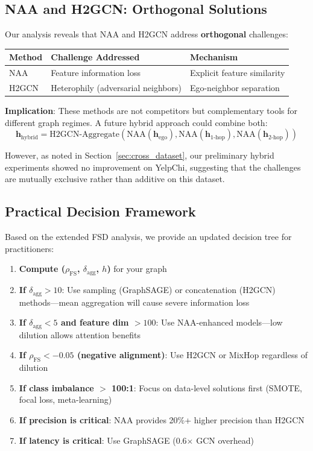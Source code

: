 \subsection{NAA and H2GCN: Orthogonal Solutions}

Our analysis reveals that NAA and H2GCN address \textbf{orthogonal} challenges:

\begin{center}
\begin{tabular}{lll}
\textbf{Method} & \textbf{Challenge Addressed} & \textbf{Mechanism} \\
\hline
NAA & Feature information loss & Explicit feature similarity \\
H2GCN & Heterophily (adversarial neighbors) & Ego-neighbor separation \\
\end{tabular}
\end{center}

\textbf{Implication}: These methods are not competitors but complementary tools for different graph regimes. A future hybrid approach could combine both:
\begin{equation}
\mathbf{h}_{\text{hybrid}} = \text{H2GCN-Aggregate}(\text{NAA}(\mathbf{h}_{\text{ego}}), \text{NAA}(\mathbf{h}_{1\text{-hop}}), \text{NAA}(\mathbf{h}_{2\text{-hop}}))
\end{equation}

However, as noted in Section~\ref{sec:cross_dataset}, our preliminary hybrid experiments showed no improvement on YelpChi, suggesting that the challenges are mutually exclusive rather than additive on this dataset.

\subsection{Practical Decision Framework}

Based on the extended FSD analysis, we provide an updated decision tree for practitioners:

\begin{enumerate}
    \item \textbf{Compute ($\rho_{\text{FS}}$, $\delta_{\text{agg}}$, $h$)} for your graph
    \item \textbf{If $\delta_{\text{agg}} > 10$}: Use sampling (GraphSAGE) or concatenation (H2GCN) methods---mean aggregation will cause severe information loss
    \item \textbf{If $\delta_{\text{agg}} < 5$ and feature dim $> 100$}: Use NAA-enhanced models---low dilution allows attention benefits
    \item \textbf{If $\rho_{\text{FS}} < -0.05$ (negative alignment)}: Use H2GCN or MixHop regardless of dilution
    \item \textbf{If class imbalance $>$ 100:1}: Focus on data-level solutions first (SMOTE, focal loss, meta-learning)
    \item \textbf{If precision is critical}: NAA provides 20\%+ higher precision than H2GCN
    \item \textbf{If latency is critical}: Use GraphSAGE (0.6$\times$ GCN overhead)
\end{enumerate}

